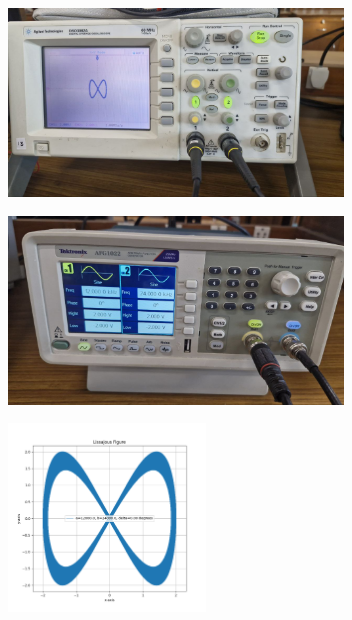 \documentclass[a4paper,12pt]{article}
\begin{document}
\begin{figure}[H]
    \centering
    \begin{subfigure}{\textwidth}
        \centering
        \includegraphics[height=5cm]{figures/3/plot.jpg}
    \end{subfigure}%
    \begin{subfigure}{\textwidth}
        \centering
        \includegraphics[height=5cm]{figures/3/para.jpg}
    \end{subfigure}
    \begin{subfigure}{\textwidth}
        \centering
        \includegraphics[height=5cm]{figures/3/Figure_3.png}
    \end{subfigure}%
\end{figure}
\end{document}
